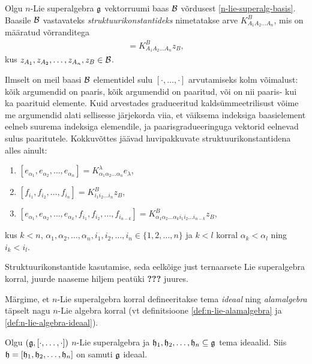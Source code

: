 \begin{dfn}
    Olgu $n$-Lie superalgebra $\mathfrak{g}$ vektorruumi baas $\mathcal{B}$ võrdusest
    \eqref{n-lie-superalg-basis}. Baasile $\mathcal{B}$ vastavateks
    \emph{struktuurikonstantideks} nimetatakse arve
    $K_{A_1 A_2 \dots A_n}^{B}$, mis on määratud võrranditega
    \begin{align*}
        [z_{A_1}, z_{A_2}, \dots, z_{A_n}] =
        K_{A_1 A_2 \dots A_n}^{B} z_B,
    \end{align*}
    kus $z_{A_1}, z_{A_2}, \dots, z_{A_n}, z_B \in \mathcal{B}$.
\end{dfn}

Ilmselt on meil baasi $\mathcal{B}$ elementidel sulu $[\cdot, \dots, \cdot]$
arvutamiseks kolm võimalust: kõik argumendid on paaris, kõik
argumendid on paaritud, või on nii paaris- kui ka paarituid elemente.
Kuid arvestades gradueeritud kaldsümmeetrilisust võime me
argumendid alati sellisesse järjekorda viia, et väiksema indeksiga
baasielement eelneb suurema indeksiga elemendile, ja
paarisgradueeringuga vektorid eelnevad sulus paaritutele.
Kokkuvõttes jäävad huvipakkuvate struktuurikonstantidena alles ainult:
\begin{enumerate}[label=\arabic*)]
    \item $[e_{\alpha_1}, e_{\alpha_2}, \dots, e_{\alpha_n}] =
        K_{\alpha_1 \alpha_2 \dots \alpha_n}^{\lambda} e_{\lambda}$,
    \item $[f_{i_1}, f_{i_2}, \dots, f_{i_n}] =
        K_{i_1 i_2 \dots i_n}^{B} z_{B}$,
    \item $[e_{\alpha_1}, e_{\alpha_2}, \dots, e_{\alpha_k},
            f_{i_1}, f_{i_2}, \dots, f_{i_{n-k}}] =
        K_{
            \alpha_1 \alpha_2 \dots \alpha_k i_1 i_2 \dots i_{n-k}
        }^{B} z_{B}$,
\end{enumerate}
kus $k < n$, $\alpha_1, \alpha_2, \dots, \alpha_n,
i_1, i_2, \dots, i_n \in \{1, 2, \dots, n\}$ ja $k < l$ korral
$\alpha_k < \alpha_l$ ning $i_k < i_l$.

Struktuurikonstantide kasutamise, seda eelkõige just ternaarsete
Lie superalgebra korral, juurde naaseme hiljem peatüki \textbf{???}
juures.

Märgime, et $n$-Lie superalgebra korral defineeritakse tema
\emph{ideaal} ning \emph{alamalgebra} täpselt nagu $n$-Lie algebra
korral (vt definitsioone \ref{def:n-lie-alamalgebra} ja
\ref{def:n-lie-algebra-ideaal}).

\begin{lemma}
    Olgu $(\mathfrak{g}, [\cdot, \dots, \cdot])$ $n$-Lie superalgebra ja
    $\mathfrak{h}_1, \mathfrak{h}_2, \dots, \mathfrak{h}_n \subseteq \mathfrak{g}$ tema ideaalid. Siis
    $\mathfrak{h} = [\mathfrak{h}_1, \mathfrak{h}_2, \dots, \mathfrak{h}_n]$ on samuti $\mathfrak{g}$ ideaal.
\end{lemma}

